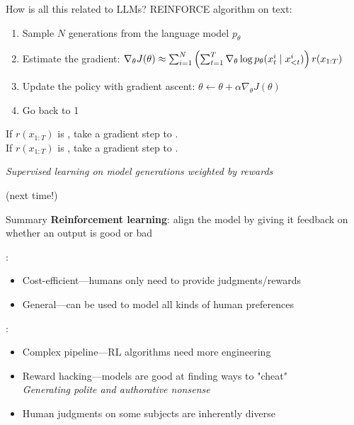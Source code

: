 \documentclass[usenames,dvipsnames,notes,11pt,aspectratio=169,hyperref={colorlinks=true, linkcolor=blue}]{beamer}
\begin{document}
\begin{frame}
    {How is all this related to LLMs?}{}
    REINFORCE algorithm on text:\\
    \begin{enumerate}
        \item Sample $N$ generations from the language model $p_\theta$
        \item Estimate the gradient: 
            $
            \nabla_\theta J(\theta) \approx \sum_{i=1}^N
            \left( \sum_{t=1}^T \nabla_\theta\log p_\theta(x_t^i\mid x_{<t}^i) \right)
            r(x_{1:T}) 
            $
        \item Update the policy with gradient ascent: $\theta \leftarrow \theta + \alpha \nabla_\theta J(\theta)$
        \item Go back to 1
    \end{enumerate}
    \pause

    \begin{mdframed}[backgroundcolor=gray!20, linewidth=0pt, frametitle={What is the algorithm doing?}]
        If $r(x_{1:T})$ is , take a gradient step to .\\ %
        If $r(x_{1:T})$ is , take a gradient step to . %

        {\em Supervised learning on model generations weighted by rewards}
    \end{mdframed}

    \pause
     (next time!)
\end{frame}

\begin{frame}
    {Summary}{}
    \textbf{Reinforcement learning}: align the model by giving it feedback on whether an output is good or bad

    :\\
    \begin{itemize}
        \item Cost-efficient---humans only need to provide judgments/rewards
        \item General---can be used to model all kinds of human preferences
    \end{itemize}

    \pause
    :\\
    \begin{itemize}
        \item Complex pipeline---RL algorithms need more engineering
        \item Reward hacking---models are good at finding ways to "cheat"\\
            {\em Generating polite and authorative nonsense}
        \item Human judgments on some subjects are inherently diverse 
    \end{itemize}
\end{frame}
\end{document}
